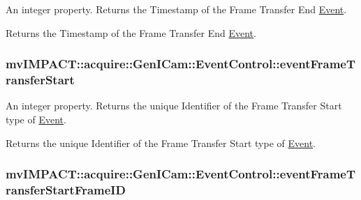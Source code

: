 An integer property. Returns the Timestamp of the Frame Transfer End \hyperlink{classmv_i_m_p_a_c_t_1_1acquire_1_1_event}{Event}. 

Returns the Timestamp of the Frame Transfer End \hyperlink{classmv_i_m_p_a_c_t_1_1acquire_1_1_event}{Event}. \hypertarget{classmv_i_m_p_a_c_t_1_1acquire_1_1_gen_i_cam_1_1_event_control_a88c174f3955c3cda0d95f67018d63c7c}{
\subsubsection[{event\+Frame\+Transfer\+Start}]{ mv\+I\+M\+P\+A\+C\+T\+::acquire\+::\+Gen\+I\+Cam\+::\+Event\+Control\+::event\+Frame\+Transfer\+Start}}\label{classmv_i_m_p_a_c_t_1_1acquire_1_1_gen_i_cam_1_1_event_control_a88c174f3955c3cda0d95f67018d63c7c}


An integer property. Returns the unique Identifier of the Frame Transfer Start type of \hyperlink{classmv_i_m_p_a_c_t_1_1acquire_1_1_event}{Event}. 

Returns the unique Identifier of the Frame Transfer Start type of \hyperlink{classmv_i_m_p_a_c_t_1_1acquire_1_1_event}{Event}. \hypertarget{classmv_i_m_p_a_c_t_1_1acquire_1_1_gen_i_cam_1_1_event_control_a22e33a79256f88a5a3fe4c99c9d4e164}{
\subsubsection[{event\+Frame\+Transfer\+Start\+Frame\+I\+D}]{ mv\+I\+M\+P\+A\+C\+T\+::acquire\+::\+Gen\+I\+Cam\+::\+Event\+Control\+::event\+Frame\+Transfer\+Start\+Frame\+I\+D}}\label{classmv_i_m_p_a_c_t_1_1acquire_1_1_gen_i_cam_1_1_event_control_a22e33a79256f88a5a3fe4c99c9d4e164}


